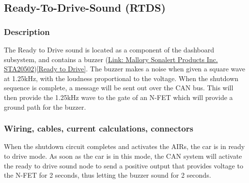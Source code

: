 \documentclass{article}
\begin{document}
\subsection{Ready-To-Drive-Sound (RTDS)}\label{ready_to_drive_sound}
\subsubsection{Description}
The Ready to Drive sound is located as a component of the dashboard subsystem, and contains a buzzer (\href{http://www.mallory-sonalert.com/specifications/STA20502.PDF}{Link: Mallory Sonalert Products Inc. STA20502})\ref{Ready to Drive}. The buzzer  makes a noise when given a square wave at 1.25kHz, with the loudness proportional
to the voltage. When the shutdown sequence is complete, a message will be sent out over the CAN bus. This will then provide the 1.25kHz wave to the gate of an N-FET which will provide a ground path for the buzzer.
\subsubsection{Wiring, cables, current calculations, connectors}
When the shutdown circuit completes and activates the AIRs, the car is in ready to drive mode. As soon as the
car is in this mode, the CAN system will activate the ready to drive sound node to send a positive output
that provides voltage to the N-FET for 2 seconds, thus letting the buzzer sound for 2 seconds. 
\end{document}

